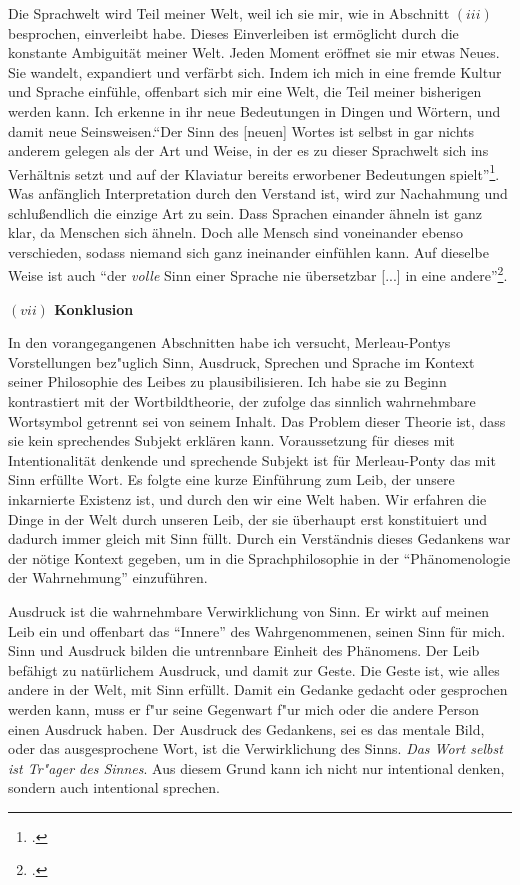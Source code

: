 \documentclass[a4paper, 12pt]{article}
\begin{document}
\begin{onehalfspace}
Die Sprachwelt wird Teil meiner Welt, weil ich sie mir, wie in Abschnitt $(iii)$ besprochen, einverleibt habe. Dieses Einverleiben ist ermöglicht durch die konstante Ambiguität meiner Welt. Jeden Moment eröffnet sie mir etwas Neues. Sie wandelt, expandiert und verfärbt sich. Indem ich mich in eine fremde Kultur und Sprache einfühle, offenbart sich mir eine Welt, die Teil meiner bisherigen werden kann. Ich erkenne in ihr neue Bedeutungen in Dingen und Wörtern, und damit neue Seinsweisen."`Der Sinn des [neuen] Wortes ist selbst in gar nichts anderem gelegen als der Art und Weise, in der es zu dieser Sprachwelt sich ins Verhältnis setzt und auf der Klaviatur bereits erworbener Bedeutungen spielt"'\footnote{\Cite[Siehe][S. 221]{merleau1966phanomenologie}.}. Was anfänglich Interpretation durch den Verstand ist, wird zur Nachahmung und schlußendlich die einzige Art zu sein. Dass Sprachen einander ähneln ist ganz klar, da Menschen sich ähneln. Doch alle Mensch sind voneinander ebenso verschieden, sodass niemand sich ganz ineinander einfühlen kann. Auf dieselbe Weise ist auch "`der \emph{volle} Sinn einer Sprache nie übersetzbar [...] in eine andere"'\footnote{\Cite[Siehe][S. 222]{merleau1966phanomenologie}.}.


\vspace{5mm}

\noindent\textbf{$(vii)$ Konklusion}

\noindent In den vorangegangenen Abschnitten habe ich versucht, Merleau-Pontys Vorstellungen bez"uglich Sinn, Ausdruck, Sprechen und Sprache im Kontext seiner Philosophie des Leibes zu plausibilisieren. Ich habe sie zu Beginn kontrastiert mit der Wortbildtheorie, der zufolge das sinnlich wahrnehmbare Wortsymbol getrennt sei von seinem Inhalt. Das Problem dieser Theorie ist, dass sie kein sprechendes Subjekt erklären kann. Voraussetzung für dieses mit Intentionalität denkende und sprechende Subjekt ist für Merleau-Ponty das mit Sinn erfüllte Wort. Es folgte eine kurze Einführung zum Leib, der unsere inkarnierte Existenz ist, und durch den wir eine Welt haben. Wir erfahren die Dinge in der Welt durch unseren Leib, der sie überhaupt erst konstituiert und dadurch immer gleich mit Sinn füllt. Durch ein Verständnis dieses Gedankens war der nötige Kontext gegeben, um in die Sprachphilosophie in der "`Phänomenologie der Wahrnehmung"' einzuführen. 

Ausdruck ist die wahrnehmbare Verwirklichung von Sinn. Er wirkt auf meinen Leib ein und offenbart das "`Innere"' des Wahrgenommenen, seinen Sinn für mich. Sinn und Ausdruck bilden die untrennbare Einheit des Phänomens. Der Leib befähigt zu natürlichem Ausdruck, und damit zur Geste. Die Geste ist, wie alles andere in der Welt, mit Sinn erfüllt. Damit ein Gedanke gedacht oder gesprochen werden kann, muss er f"ur seine Gegenwart f"ur mich oder die andere Person einen Ausdruck haben. Der Ausdruck des Gedankens, sei es das mentale Bild, oder das ausgesprochene Wort, ist die Verwirklichung des Sinns. \emph{Das Wort selbst ist Tr"ager des Sinnes}. Aus diesem Grund kann ich nicht nur intentional denken, sondern auch intentional sprechen.



\end{onehalfspace}
\nocite{*}
%
\printbibliography
\end{document}

